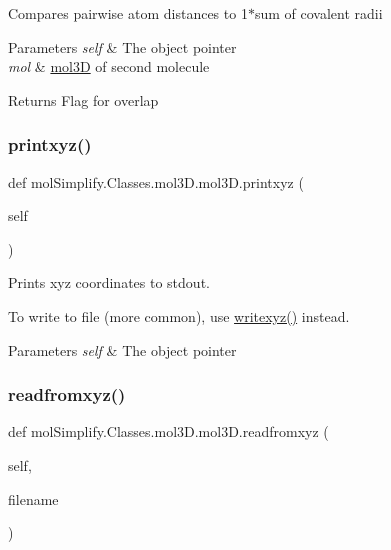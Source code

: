 Compares pairwise atom distances to 1$\ast$sum of covalent radii 
\begin{DoxyParams}{Parameters}
{\em self} & The object pointer \\
\hline
{\em mol} & \hyperlink{classmolSimplify_1_1Classes_1_1mol3D_1_1mol3D}{mol3D} of second molecule \\
\hline
\end{DoxyParams}
\begin{DoxyReturn}{Returns}
Flag for overlap 
\end{DoxyReturn}
\mbox{\label{classmolSimplify_1_1Classes_1_1mol3D_1_1mol3D_ae6f619f46f387b2b609807fe06a6876a}} 
\subsubsection{\texorpdfstring{printxyz()}{printxyz()}}
{\footnotesize\ttfamily def mol\+Simplify.\+Classes.\+mol3\+D.\+mol3\+D.\+printxyz (\begin{DoxyParamCaption}\item[{}]{self }\end{DoxyParamCaption})}



Prints xyz coordinates to stdout. 

To write to file (more common), use \hyperlink{classmolSimplify_1_1Classes_1_1mol3D_1_1mol3D_a9d338e17fae1e6f4d7a9012a76844e7c}{writexyz()} instead. 
\begin{DoxyParams}{Parameters}
{\em self} & The object pointer \\
\hline
\end{DoxyParams}
\mbox{\label{classmolSimplify_1_1Classes_1_1mol3D_1_1mol3D_a693d0fb9d44650a500c91cac47e93a80}} 
\subsubsection{\texorpdfstring{readfromxyz()}{readfromxyz()}}
{\footnotesize\ttfamily def mol\+Simplify.\+Classes.\+mol3\+D.\+mol3\+D.\+readfromxyz (\begin{DoxyParamCaption}\item[{}]{self,  }\item[{}]{filename }\end{DoxyParamCaption})}



